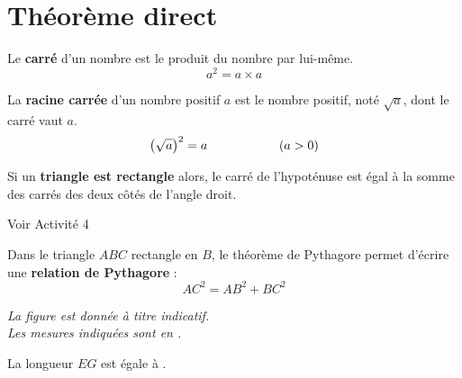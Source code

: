 \section{Théorème direct}

\begin{definition}
    Le {\bfseries carré}  d'un nombre est le produit du nombre par lui-même.
    $$a^2=a\times a$$
\end{definition}

\begin{definition}
    La {\bfseries racine carrée} d'un nombre positif $a$ est le nombre positif, noté $\sqrt{a}$, dont le carré vaut $a$.
    $$\left(\sqrt{a}\right)^2=a\kern20mm(a>0)$$
\end{definition}

\begin{propriete}
    Si un \textbf{triangle est rectangle} alors, le carré de l'hypoténuse est égal à la somme des carrés des deux côtés de l'angle droit.
\end{propriete}

\begin{preuve}
    Voir Activité 4
\end{preuve}

\begin{propriete}
    \begin{minipage}{0.3\linewidth}
    \end{minipage}
    \begin{minipage}{0.7\linewidth}
        Dans le triangle $ABC$ rectangle en $B$, le théorème de Pythagore permet d'écrire une \textbf{relation de Pythagore} :
        $$AC^2=AB^2+BC^2$$
    \end{minipage}
\end{propriete}

\begin{methode}    
    \exercice

    {\it La figure est donnée à titre indicatif.\\ Les mesures indiquées sont en \Lg{}.}
    
    \vspace*{10mm}
    \correction
    La longueur $EG$ est égale à \Lg{\ResultatPytha}.
\end{methode}

